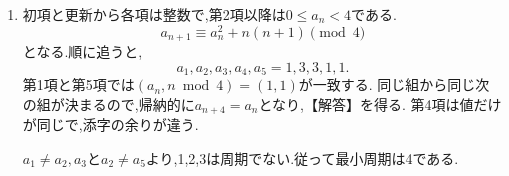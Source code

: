     \noindent {}\par\nobreak
    \begin{enumerate}[label=(\arabic*),parsep=3pt,beginpenalty=10000,format=\bookitemlink{example-gauss-role-3}{solution}{problem}]
      \item 初項と更新から各項は整数で,第2項以降は$0\le a_n<4$である.
            \[
              a_{n+1}\equiv a_n^2+n(n+1)\pmod4
            \]
            となる.順に追うと,
            \[
              a_1,a_2,a_3,a_4,a_5=1,3,3,1,1.
            \]
            第1項と第5項では$(a_n,n\bmod4)=(1,1)$が一致する.
            同じ組から同じ次の組が決まるので,帰納的に$a_{n+4}=a_n$となり,【解答】を得る.
            第4項は値だけが同じで,添字の余りが違う.

            $a_1\ne a_2,a_3$と$a_2\ne a_5$より,1,2,3は周期でない.従って最小周期は4である.
    \end{enumerate}
